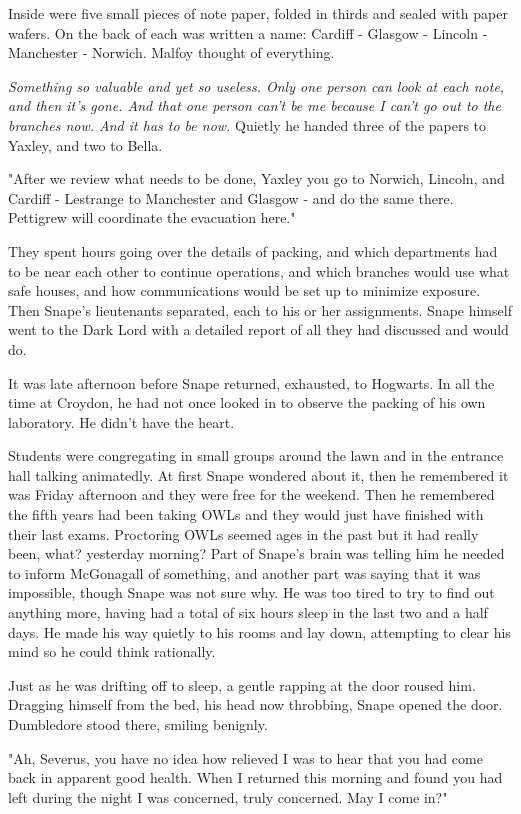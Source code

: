 \documentclass[a4paper,11pt]{article}
\begin{document}
Inside were five small pieces of note paper, folded in thirds and sealed with paper wafers. On the back of each was written a name: Cardiff - Glasgow - Lincoln - Manchester - Norwich. Malfoy thought of everything.

\emph{Something so valuable and yet so useless. Only one person can look at each note, and then it's gone. And that one person can't be me because I can't go out to the branches now. And it has to be now.} Quietly he handed three of the papers to Yaxley, and two to Bella.

"After we review what needs to be done, Yaxley you go to Norwich, Lincoln, and Cardiff - Lestrange to Manchester and Glasgow - and do the same there. Pettigrew will coordinate the evacuation here."

They spent hours going over the details of packing, and which departments had to be near each other to continue operations, and which branches would use what safe houses, and how communications would be set up to minimize exposure. Then Snape's lieutenants separated, each to his or her assignments. Snape himself went to the Dark Lord with a detailed report of all they had discussed and would do.

It was late afternoon before Snape returned, exhausted, to Hogwarts. In all the time at Croydon, he had not once looked in to observe the packing of his own laboratory. He didn't have the heart.

Students were congregating in small groups around the lawn and in the entrance hall talking animatedly. At first Snape wondered about it, then he remembered it was Friday afternoon and they were free for the weekend. Then he remembered the fifth years had been taking OWLs and they would just have finished with their last exams. Proctoring OWLs seemed ages in the past but it had really been, what? yesterday morning? Part of Snape's brain was telling him he needed to inform McGonagall of something, and another part was saying that it was impossible, though Snape was not sure why. He was too tired to try to find out anything more, having had a total of six hours sleep in the last two and a half days. He made his way quietly to his rooms and lay down, attempting to clear his mind so he could think rationally.

Just as he was drifting off to sleep, a gentle rapping at the door roused him. Dragging himself from the bed, his head now throbbing, Snape opened the door. Dumbledore stood there, smiling benignly.

"Ah, Severus, you have no idea how relieved I was to hear that you had come back in apparent good health. When I returned this morning and found you had left during the night I was concerned, truly concerned. May I come in?"
\end{document}
